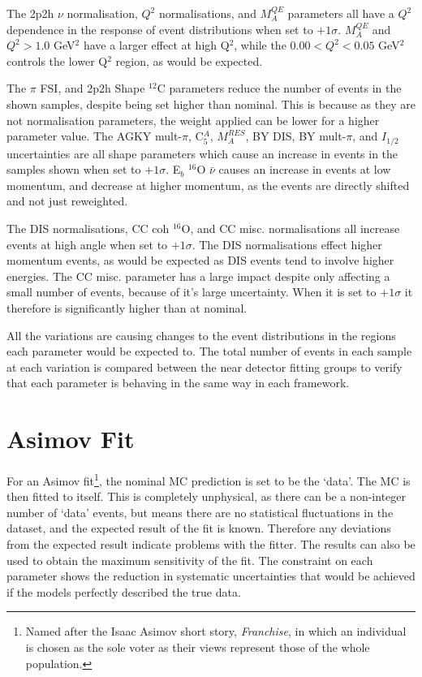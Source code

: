 The 2p2h $\nu$ normalisation, $Q^2$ normalisations, and $M^{QE}_A$ parameters all have a $Q^2$ dependence in the response of event distributions when set to $+1\sigma$. $M^{QE}_A$ and $Q^{2}>1.0$ GeV$^2$ have a larger effect at high Q$^2$, while the $0.00<Q^{2}<0.05$ GeV$^2$ controls the lower Q$^2$ region, as would be expected.

The $\pi$ FSI, and 2p2h Shape $^{12}$C parameters reduce the number of events in the shown samples, despite being set higher than nominal. This is because as they are not normalisation parameters, the weight applied can be lower for a higher parameter value. The AGKY mult-$\pi$, C$^{A}_{5}$, $M^{RES}_{A}$, BY DIS, BY mult-$\pi$, and $I_{1/2}$ uncertainties are all shape parameters which cause an increase in events in the samples shown when set to $+1\sigma$. E$_{b}$ $^{16}$O $\bar{\nu}$ causes an increase in events at low momentum, and decrease at higher momentum, as the events are directly shifted and not just reweighted.

The DIS normalisations, CC coh $^{16}$O, and CC misc. normalisations all increase events at high angle when set to $+1\sigma$. The DIS normalisations effect higher momentum events, as would be expected as DIS events tend to involve higher energies. The CC misc. parameter has a large impact despite only affecting a small number of events, because of it's large uncertainty. When it is set to $+1\sigma$ it therefore is significantly higher than at nominal.

All the variations are causing changes to the event distributions in the regions each parameter would be expected to. The total number of events in each sample at each variation is compared between the near detector fitting groups to verify that each parameter is behaving in the same way in each framework.

\section{Asimov Fit}\label{sec:asimov}

For an Asimov fit\footnote{Named after the Isaac Asimov short story, \textit{Franchise}, in which an individual is chosen as the sole voter as their views represent those of the whole population.}, the nominal MC prediction is set to be the `data'. The MC is then fitted to itself. This is completely unphysical, as there can be a non-integer number of `data' events, but means there are no statistical fluctuations in the dataset, and the expected result of the fit is known. Therefore any deviations from the expected result indicate problems with the fitter. The results can also be used to obtain the maximum sensitivity of the fit. The constraint on each parameter shows the reduction in systematic uncertainties that would be achieved if the models perfectly described the true data.

